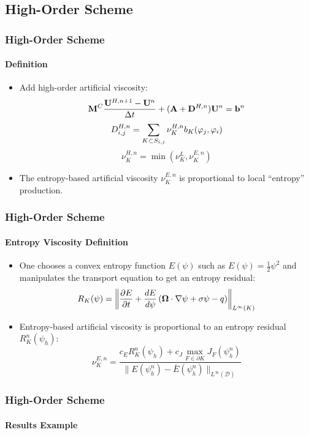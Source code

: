 \documentclass{beamer}
\begin{document}
\subsection{High-Order Scheme}
\begin{frame}
\frametitle{High-Order Scheme}
\framesubtitle{Definition}

\begin{itemize}
   \item Add high-order artificial viscosity:
   \begin{equation}
      \mathbf{M}^C\frac{\mathbf{U}^{H,n+1}-\mathbf{U}^n}{\Delta t} + (\mathbf{A} + \mathbf{D}^{H,n})\mathbf{U}^n = \mathbf{b}^n
   \end{equation}
   \begin{equation}
      D_{i,j}^{H,n} = \sum\limits_{K\subset S_{i,j}}\nu_K^{H,n} b_K(\varphi_j,\varphi_i)
   \end{equation}
   \begin{equation}
      \nu^{H,n}_K = \min(\nu^{L}_K,\nu^{E,n}_K)
   \end{equation}
   \item The entropy-based artificial viscosity $\nu^{E,n}_K$ is
   proportional to local ``entropy'' production.
\end{itemize}

\end{frame}
\begin{frame}
\frametitle{High-Order Scheme}
\framesubtitle{Entropy Viscosity Definition}

\begin{itemize}
   \item One chooses a convex entropy function $E(\psi)$ such
   as $E(\psi)=\frac{1}{2}\psi^2$ and manipulates the
   transport equation to get an entropy residual:
   \begin{equation}
      R_K(\psi) = \left\|\frac{\partial E}{\partial t}
      + \frac{dE}{d\psi}\left(\mathbf{\Omega}\cdot\nabla \psi
      + \sigma \psi
      - q \right)\right\|_{L^\infty(K)}
   \end{equation}
   \item Entropy-based artificial viscosity is proportional to an entropy
   residual $R_K^n(\psi_h)$:
   \begin{equation}
      \nu^{E,n}_K = \frac{c_E R_K^n(\psi_h)
      + c_J\max\limits_{F\in\partial K}J_F(\psi_h^n)}
      {\|E(\psi_h^n)-\bar{E}(\psi_h^n)\|_{L^\infty(\mathcal{D})}}
   \end{equation}
\end{itemize}
   
\end{frame}
\begin{frame}
\frametitle{High-Order Scheme}
\framesubtitle{Results Example}


\end{frame}
\end{document}
